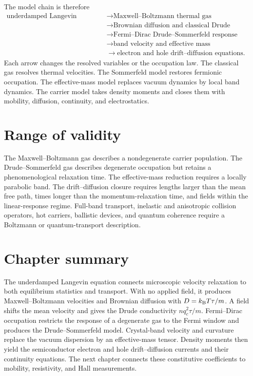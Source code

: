 The model chain is therefore
\begin{equation}
\begin{aligned}
  \text{underdamped Langevin dynamics}
  &\longrightarrow \text{Maxwell--Boltzmann thermal gas}\\
  &\longrightarrow \text{Brownian diffusion and classical Drude response}\\
  &\longrightarrow \text{Fermi--Dirac Drude--Sommerfeld response}\\
  &\longrightarrow \text{band velocity and effective mass}\\
  &\longrightarrow \text{electron and hole drift--diffusion equations}.
\end{aligned}
  \label{eq:carrier-model-chain}
\end{equation}
Each arrow changes the resolved variables or the occupation law.  The classical
gas resolves thermal velocities.  The Sommerfeld model restores fermionic
occupation.  The effective-mass model replaces vacuum dynamics by local band
dynamics.  The carrier model takes density moments and closes them with
mobility, diffusion, continuity, and electrostatics.

\section{Range of validity}

The Maxwell--Boltzmann gas describes a nondegenerate carrier population.  The
Drude--Sommerfeld gas describes degenerate occupation but retains a
phenomenological relaxation time.  The effective-mass reduction requires a
locally parabolic band.  The drift--diffusion closure requires lengths larger
than the mean free path, times longer than the momentum-relaxation time, and
fields within the linear-response regime.  Full-band transport, inelastic and
anisotropic collision operators, hot carriers, ballistic devices, and quantum
coherence require a Boltzmann or quantum-transport description.

\section{Chapter summary}

The underdamped Langevin equation connects microscopic velocity relaxation to
both equilibrium statistics and transport.  With no applied field, it produces
Maxwell--Boltzmann velocities and Brownian diffusion with
$D=k_{\mathrm B} T\tau/m$.  A field shifts the mean velocity and gives the Drude
conductivity $nq_c^2\tau/m$.  Fermi--Dirac occupation restricts the response of
a degenerate gas to the Fermi window and produces the Drude--Sommerfeld model.
Crystal-band velocity and curvature replace the vacuum dispersion by an
effective-mass tensor.  Density moments then yield the semiconductor electron
and hole drift--diffusion currents and their continuity equations.  The next
chapter connects these constitutive coefficients to mobility, resistivity, and
Hall measurements.
